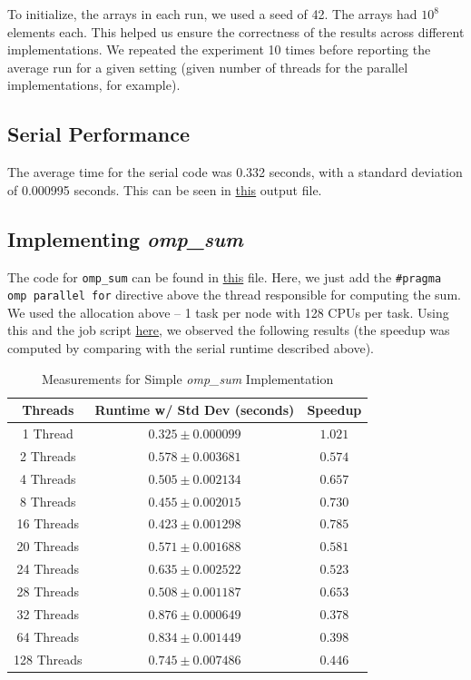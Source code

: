 \documentclass[a4paper,10pt]{article}
\begin{document}
To initialize, the arrays in each run, we used a seed of 42. The arrays had $10^8$ elements each. This helped us ensure the correctness of the results across different implementations. We repeated the experiment 10 times before reporting the average run for a given setting (given number of threads for the parallel implementations, for example). 

\subsection{Serial Performance}
The average time for the serial code was 0.332 seconds, with a standard deviation of 0.000995 seconds. This can be seen in \href{https://github.com/paulmyr/DD2356-MethodsHPC/blob/master/3_open_mp/exercise3/outputs/serial_output.txt}{this} output file.

\subsection{Implementing \textit{omp\_sum}}
The code for \verb|omp_sum| can be found in \href{https://github.com/paulmyr/DD2356-MethodsHPC/blob/master/3_open_mp/exercise3/omp_sum.c}{this} file. Here, we just add the \verb|#pragma omp parallel for| directive above the thread responsible for computing the sum. We used the allocation above -- 1 task per node with 128 CPUs per task. Using this and the job script \href{https://github.com/paulmyr/DD2356-MethodsHPC/blob/master/3_open_mp/exercise3/job_scripts/omp_sum_job.sh}{here}, we observed the following results (the speedup was computed by comparing with the serial runtime described above). 


\begin{table}[h!]
\centering
\begin{tabular}{|c|c|c|}
\hline
\textbf{Threads} & \textbf{Runtime w/ Std Dev (seconds)} & \textbf{Speedup} \\
\hline
1 Thread  & $0.325 \pm 0.000099$  & $1.021$ \\
2 Threads & $0.578 \pm 0.003681$  & $0.574$ \\
4 Threads & $0.505 \pm 0.002134$  & $0.657$ \\
8 Threads & $0.455 \pm 0.002015$  & $0.730$ \\
16 Threads & $0.423 \pm 0.001298$ & $0.785$ \\
20 Threads & $0.571 \pm 0.001688$ & $0.581$ \\
24 Threads & $0.635 \pm 0.002522$ & $0.523$ \\
28 Threads & $0.508 \pm 0.001187$ & $0.653$ \\
32 Threads & $0.876 \pm 0.000649$ & $0.378$ \\
64 Threads & $0.834 \pm 0.001449$ & $0.398$ \\
128 Threads & $0.745 \pm 0.007486$ & $0.446$ \\
\hline
\end{tabular}
\caption{Measurements for Simple \textit{omp\_sum} Implementation}
\end{table}
\end{document}
